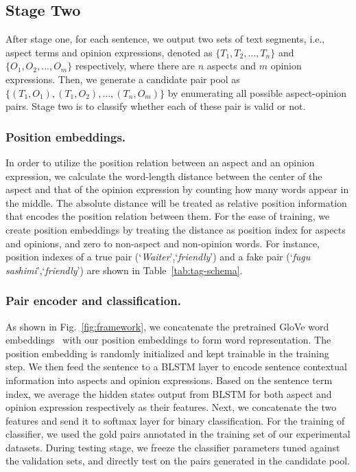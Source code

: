 \documentclass[letterpaper]{article} \usepackage{aaai20}  \usepackage{times}  \usepackage{helvet} \usepackage{courier}  \usepackage[hyphens]{url}  \usepackage{graphicx} \urlstyle{rm} \def\UrlFont{\rm}  \usepackage{graphicx}  \frenchspacing  \setlength{\pdfpagewidth}{8.5in}  \setlength{\pdfpageheight}{11in}
\begin{document}
\subsection{Stage Two}
After stage one, for each sentence, we output two sets of text segments, i.e., aspect terms and opinion expressions, denoted as $\{T_{1}, T_{2}, ..., T_{n}\}$ and $\{O_{1}, O_{2}, ..., O_{m}\}$ respectively, where there are $n$ aspects and $m$ opinion expressions. Then, we generate a candidate pair pool as $\{(T_1,O_1), (T_1,O_2), ... , (T_n,O_m)\}$ by enumerating all possible aspect-opinion pairs. Stage two is to classify whether each of these pair is valid or not.

\subsubsection{Position embeddings.}
In order to utilize the position relation between an aspect and an opinion expression, we calculate the word-length distance between the center of the aspect and that of the opinion expression by counting how many words appear in the middle. The absolute distance will be treated as relative position information that encodes the position relation between them. For the ease of training, we create position embeddings by treating the distance as position index for aspects and opinions, and zero to non-aspect and non-opinion words. For instance, position indexes of a true pair (`\textit{Waiter}',`\textit{friendly}') and a fake pair (`\textit{fugu sashimi}',`\textit{friendly}') are shown in Table~\ref{tab:tag-schema}.

\subsubsection{Pair encoder and classification.}
As shown in Fig.~\ref{fig:framework}, we concatenate the pretrained GloVe word embeddings~\cite{D14-1162} with our position embeddings to form word representation. The position embedding is randomly initialized and kept trainable in the training step. We then feed the sentence to a BLSTM layer to encode sentence contextual information into aspects and opinion expressions. Based on the sentence term index, we average the hidden states output from BLSTM for both aspect and opinion expression respectively as their features. Next, we concatenate the two features and send it to softmax layer for binary classification. 
For the training of classifier, we used the gold pairs annotated in the training set of our experimental datasets. During testing stage, we freeze the classifier parameters tuned against the validation sets, and directly test on the pairs generated in the candidate pool.
\end{document}
